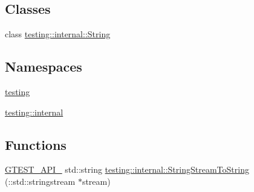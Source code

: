\subsection*{Classes}
\begin{DoxyCompactItemize}
\item 
class \hyperlink{classtesting_1_1internal_1_1String}{testing\+::internal\+::\+String}
\end{DoxyCompactItemize}
\subsection*{Namespaces}
\begin{DoxyCompactItemize}
\item 
 \hyperlink{namespacetesting}{testing}
\item 
 \hyperlink{namespacetesting_1_1internal}{testing\+::internal}
\end{DoxyCompactItemize}
\subsection*{Functions}
\begin{DoxyCompactItemize}
\item 
\hyperlink{gtest-port_8h_aa73be6f0ba4a7456180a94904ce17790}{G\+T\+E\+S\+T\+\_\+\+A\+P\+I\+\_\+} std\+::string \hyperlink{namespacetesting_1_1internal_a75bdbc38815772055696b2a40bae614e}{testing\+::internal\+::\+String\+Stream\+To\+String} (\+::std\+::stringstream $\ast$stream)
\end{DoxyCompactItemize}
